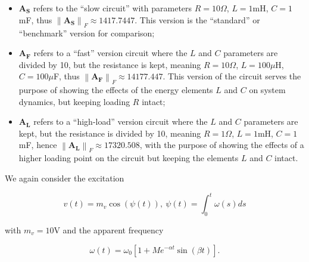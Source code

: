 \begin{example}
\begin{itemize}
	\item $\mathbf{A_S}$ refers to the ``slow circuit'' with parameters $R = 10\Omega$, $L = 1$mH, $C = 1$mF, thus $\left\lVert\mathbf{A_S}\right\rVert_F \approx 1417.7447$. This version is the ``standard'' or ``benchmark'' version for comparison;
	\item $\mathbf{A_F}$ refers to a ``fast'' version circuit where the $L$ and $C$ parameters are divided by 10, but the resistance is kept, meaning $R = 10\Omega$, $L = 100\mu$H, $C = 100\mu$F, thus $\left\lVert\mathbf{A_F}\right\rVert_F \approx 14177.447$. This version of the circuit serves the purpose of showing the effects of the energy elements $L$ and $C$ on system dynamics, but keeping loading $R$ intact;
	\item $\mathbf{A_L}$ refers to a ``high-load'' version circuit where the $L$ and $C$ parameters are kept, but the resistance is divided by 10, meaning $R = 1\Omega$, $L = 1$mH, $C = 1$mF, hence $\left\lVert\mathbf{A_L}\right\rVert_F\approx 17320.508$, with the purpose of showing the effects of a higher loading point on the circuit but keeping the elements $L$ and $C$ intact.
\end{itemize}

	We again consider the excitation

\begin{equation} v(t) = m_v \cos\left(\psi(t)\right),\ \psi(t) = \int_0^t \omega(s)ds \end{equation}

	\noindent with $m_v = 10$V and the apparent frequency

\begin{equation} \omega(t) = \omega_0\left[1 + Me^{-\alpha t}\sin\left(\beta t\right)\right] .\end{equation}


\end{example}

